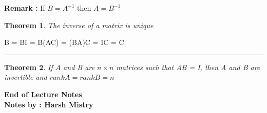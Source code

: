 \documentclass{article}
\newcounter{lecnum}
\newtheorem{theorem}{Theorem}[lecnum]
\newenvironment{proof}{{\bf Proof:}}{\hfill\rule{2mm}{2mm}}
\begin{document}
\textbf{Remark : } If \( B = A^{-1}\) then \( A = B^{-1} \) 

\begin{theorem}
The inverse of a matrix is unique
\end{theorem} 

\begin{proof}
B = BI = B(AC) = (BA)C = IC = C 
\end{proof}

\begin{theorem}
If A and B are \( n \times n \) matrices such that AB = I, then A and B are invertible and \(rank A = rank B = n \)
\end{theorem}



\begin{center}
\textbf{End of Lecture Notes}\\
\textbf{Notes by : Harsh Mistry}
\end{center}
\end{document}
